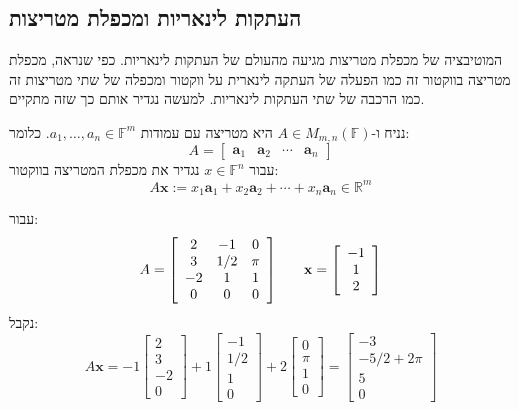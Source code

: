 \documentclass{tstextbook}
\begin{document}
\subsection{העתקות לינאריות ומכפלת מטריצות}

המוטיבציה של מכפלת מטריצות מגיעה מהעולם של העתקות לינאריות. כפי שנראה, מכפלת מטריצה בווקטור זה כמו הפעלה של העתקה לינארית על ווקטור ומכפלה של שתי מטריצות זה כמו הרכבה של שתי העתקות לינאריות. למעשה נגדיר אותם כך שזה מתקיים.

\begin{definition}
נניח ו-\(A\in M_{m,n}\left( \mathbb{F} \right)\) היא מטריצה עם עמודות \(a_{1},\dots,a_{n}\in \mathbb{F} ^{m}\). כלומר:
$$A=\begin{bmatrix}\mathbf{a}_{1}&\mathbf{a}_{2}&\cdots&\mathbf{a}_{n}\end{bmatrix}$$
עבור \(x \in \mathbb{F} ^{n}\) נגדיר את מכפלת המטריצה בווקטור:
$$A\mathbf{x}:=x_{1}\mathbf{a}_{1}+x_{2}\mathbf{a}_{2}+\cdots+x_{n}\mathbf{a}_{n}\in\mathbb{R}^{m}$$

\end{definition}
\begin{example}
עבור:
$$A={\left[\begin{array}{c c c}{2}&{-1}&{0}\\ {3}&{1/2}&{\pi}\\ {-2}&{1}&{1}\\ {0}&{0}&{0}\end{array}\right]}\quad\quad{\mathbf{x}}={\left[\begin{array}{c}{-1}\\ {1}\\ {2}\end{array}\right]}$$
נקבל:
$$A\mathbf{x}=-1\begin{bmatrix}2\\ 3\\ -2\\ 0\end{bmatrix}+1\begin{bmatrix}-1\\ 1/2\\ 1\\ 0\end{bmatrix}+2\begin{bmatrix}0\\ \pi\\ 1\\ 0\end{bmatrix}=\begin{bmatrix}-3\\ -5/2+2\pi\\ 5\\ 0\end{bmatrix}$$

\end{example}
\end{document}
